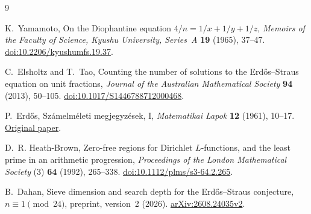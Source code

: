 \documentclass[11pt,a4paper]{article}
\theoremstyle{definition}
\newcommand{\ES}{Erd\H{o}s--Straus}
\begin{document}
\begin{thebibliography}{9}

K.~Yamamoto,
On the Diophantine equation \(4/n=1/x+1/y+1/z\),
\textit{Memoirs of the Faculty of Science, Kyushu University,
Series~A} \textbf{19} (1965), 37--47.
\href{https://doi.org/10.2206/kyushumfs.19.37}{doi:10.2206/kyushumfs.19.37}.

C.~Elsholtz and T.~Tao,
Counting the number of solutions to the \ES{} equation on unit fractions,
\textit{Journal of the Australian Mathematical Society}
\textbf{94} (2013), 50--105.
\href{https://doi.org/10.1017/S1446788712000468}{doi:10.1017/S1446788712000468}.

P.~Erd\H{o}s,
Sz\'amelm\'eleti megjegyz\'esek, I,
\textit{Matematikai Lapok} \textbf{12} (1961), 10--17.
\href{https://www.renyi.hu/~p_erdos/1961-23.pdf}{Original paper}.

D.~R. Heath-Brown,
Zero-free regions for Dirichlet \(L\)-functions, and the least prime
in an arithmetic progression,
\textit{Proceedings of the London Mathematical Society} (3)
\textbf{64} (1992), 265--338.
\href{https://doi.org/10.1112/plms/s3-64.2.265}{doi:10.1112/plms/s3-64.2.265}.

B.~Dahan,
Sieve dimension and search depth for the \ES{} conjecture,
\(n\equiv1\pmod{24}\), preprint, version~2 (2026).
\href{https://arxiv.org/abs/2608.24035v2}{arXiv:2608.24035v2}.

\end{thebibliography}
\end{document}
